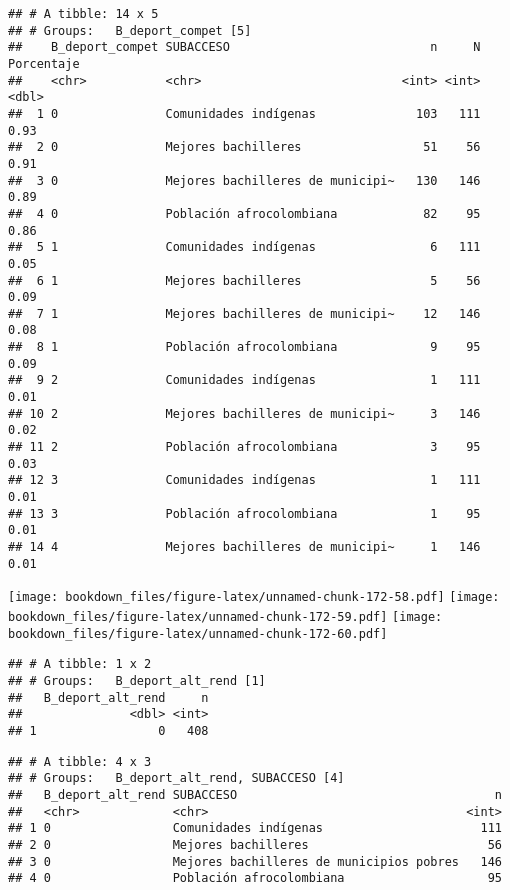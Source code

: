 \documentclass[]{article}
\theoremstyle{definition}
\theoremstyle{definition}
\theoremstyle{definition}
\theoremstyle{remark}
\begin{document}
\begin{verbatim}
## # A tibble: 14 x 5
## # Groups:   B_deport_compet [5]
##    B_deport_compet SUBACCESO                            n     N Porcentaje
##    <chr>           <chr>                            <int> <int>      <dbl>
##  1 0               Comunidades indígenas              103   111       0.93
##  2 0               Mejores bachilleres                 51    56       0.91
##  3 0               Mejores bachilleres de municipi~   130   146       0.89
##  4 0               Población afrocolombiana            82    95       0.86
##  5 1               Comunidades indígenas                6   111       0.05
##  6 1               Mejores bachilleres                  5    56       0.09
##  7 1               Mejores bachilleres de municipi~    12   146       0.08
##  8 1               Población afrocolombiana             9    95       0.09
##  9 2               Comunidades indígenas                1   111       0.01
## 10 2               Mejores bachilleres de municipi~     3   146       0.02
## 11 2               Población afrocolombiana             3    95       0.03
## 12 3               Comunidades indígenas                1   111       0.01
## 13 3               Población afrocolombiana             1    95       0.01
## 14 4               Mejores bachilleres de municipi~     1   146       0.01
\end{verbatim}

\texttt{[image: bookdown\_files/figure-latex/unnamed-chunk-172-58.pdf]}
\texttt{[image: bookdown\_files/figure-latex/unnamed-chunk-172-59.pdf]}
\texttt{[image: bookdown\_files/figure-latex/unnamed-chunk-172-60.pdf]}

\begin{verbatim}
## # A tibble: 1 x 2
## # Groups:   B_deport_alt_rend [1]
##   B_deport_alt_rend     n
##               <dbl> <int>
## 1                 0   408
\end{verbatim}

\begin{verbatim}
## # A tibble: 4 x 3
## # Groups:   B_deport_alt_rend, SUBACCESO [4]
##   B_deport_alt_rend SUBACCESO                                    n
##   <chr>             <chr>                                    <int>
## 1 0                 Comunidades indígenas                      111
## 2 0                 Mejores bachilleres                         56
## 3 0                 Mejores bachilleres de municipios pobres   146
## 4 0                 Población afrocolombiana                    95
\end{verbatim}
\end{document}
